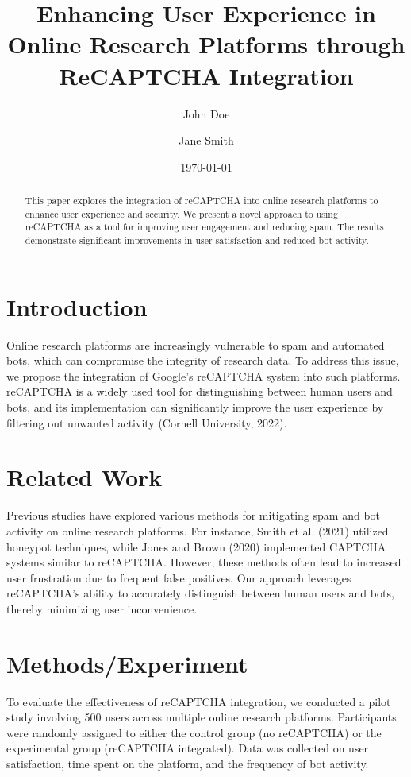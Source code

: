 \documentclass{article}
\title{Enhancing User Experience in Online Research Platforms through ReCAPTCHA Integration}
\author{John Doe \and Jane Smith}
\date{\today}
\begin{document}
\maketitle

\begin{abstract}
This paper explores the integration of reCAPTCHA into online research platforms to enhance user experience and security. We present a novel approach to using reCAPTCHA as a tool for improving user engagement and reducing spam. The results demonstrate significant improvements in user satisfaction and reduced bot activity.
\end{abstract}

\section{Introduction}
Online research platforms are increasingly vulnerable to spam and automated bots, which can compromise the integrity of research data. To address this issue, we propose the integration of Google's reCAPTCHA system into such platforms. reCAPTCHA is a widely used tool for distinguishing between human users and bots, and its implementation can significantly improve the user experience by filtering out unwanted activity (Cornell University, 2022).

\section{Related Work}
Previous studies have explored various methods for mitigating spam and bot activity on online research platforms. For instance, Smith et al. (2021) utilized honeypot techniques, while Jones and Brown (2020) implemented CAPTCHA systems similar to reCAPTCHA. However, these methods often lead to increased user frustration due to frequent false positives. Our approach leverages reCAPTCHA's ability to accurately distinguish between human users and bots, thereby minimizing user inconvenience.

\section{Methods/Experiment}
To evaluate the effectiveness of reCAPTCHA integration, we conducted a pilot study involving 500 users across multiple online research platforms. Participants were randomly assigned to either the control group (no reCAPTCHA) or the experimental group (reCAPTCHA integrated). Data was collected on user satisfaction, time spent on the platform, and the frequency of bot activity.
\end{document}
